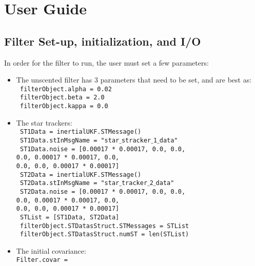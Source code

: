 
\section{User Guide}
\subsection{Filter Set-up, initialization, and I/O}

In order for the filter to run, the user must set a few parameters:

\begin{itemize}
\item The unscented filter has 3 parameters that need to be set, and are best as: \\
      \texttt{ filterObject.alpha = 0.02} \\
      \texttt{ filterObject.beta = 2.0} \\
      \texttt{ filterObject.kappa = 0.0} 
\item The star trackers: \\ 
  \texttt{    ST1Data = inertialUKF.STMessage()}\\
    \texttt{  ST1Data.stInMsgName = "star$\_$stracker$\_$1$\_$data"}\\
  \texttt{    ST1Data.noise = [0.00017 * 0.00017, 0.0, 0.0,\\
                         0.0, 0.00017 * 0.00017, 0.0,\\
                         0.0, 0.0, 0.00017 * 0.00017]}\\
   \texttt{   ST2Data = inertialUKF.STMessage()}\\
  \texttt{    ST2Data.stInMsgName = "star$\_$tracker$\_$2$\_$data"}\\
    \texttt{  ST2Data.noise = [0.00017 * 0.00017, 0.0, 0.0,\\
                         0.0, 0.00017 * 0.00017, 0.0,\\
                         0.0, 0.0, 0.00017 * 0.00017]}\\
  \texttt{    STList = [ST1Data, ST2Data]}\\
   \texttt{   filterObject.STDatasStruct.STMessages = STList}\\
   \texttt{   filterObject.STDatasStruct.numST = len(STList)}\\
\item The initial covariance: \\
 \texttt{Filter.covar =} \\

\end{itemize}
